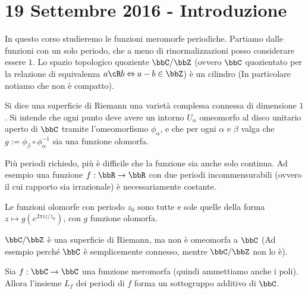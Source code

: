 \chapter{19 Settembre 2016 - Introduzione}
\justify

In questo corso studieremo le funzioni meromorfe periodiche.  Partiamo dalle funzioni con un solo periodo, che a meno di rinormalizzazioni posso considerare essere $1$.  Lo spazio topologico quoziente $\bbC / \bbZ$ (ovvero $\bbC$ quozientato per la relazione di equivalenza $a \cR b \sse a-b \in \bbZ$) è un cilindro (In particolare notiamo che non è compatto).

\begin{definizione}
  Si dice una superficie di Riemann una varietà complessa connessa di dimensione $1$.  Si intende che ogni punto deve avere un intorno $U_\alpha$ omeomorfo al disco unitario aperto di $\bbC$ tramite l'omeomorfismo $\phi_\alpha$, e che per ogni $\alpha$ e $\beta$ valga che $g := \phi_\beta \circ \phi_\alpha^{-1}$ sia una funzione olomorfa.
\end{definizione}


\begin{osservazione}
  Più periodi richiedo, più è difficile che la funzione sia anche solo continua. Ad esempio una funzione $f: \bbR \rar \bbR$ con due periodi incommensurabili (ovvero il cui rapporto sia irrazionale) è necessariamente costante.
\end{osservazione}

\begin{esercizio}
  Le funzioni olomorfe con periodo $z_0$ sono tutte e sole quelle della
  forma $z \mapsto g(e^{2\pi i z/z_0})$, con $g$ funzione olomorfa.
\end{esercizio}

\begin{osservazione}
  $\bbC / \bbZ$ è una superficie di Riemann, ma non è omeomorfa a $\bbC$ (Ad esempio perché $\bbC$ è semplicemente connesso, mentre $\bbC / \bbZ$ non lo è).
\end{osservazione}

\begin{lemma}
  Sia $f: \bbC \rar \bbC$ una funzione meromorfa (quindi ammettiamo anche i poli).  Allora l'insieme $L_f$ dei periodi di $f$ forma un sottogruppo additivo di $\bbC$.

\end{lemma}

